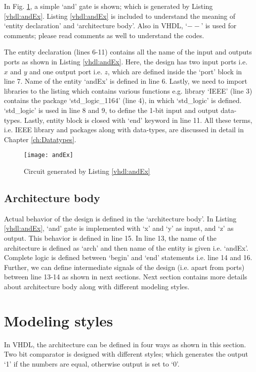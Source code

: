 In Fig. \ref{fig:andEx}, a simple `and' gate is shown; which is generated by Listing \ref{vhdl:andEx}. Listing \ref{vhdl:andEx} is included to understand the meaning of `entity declaration' and `architecture body'. Also in VHDL, `$--$' is used for comments; please read comments as well to understand the codes.

The entity declaration (lines 6-11) contains all the name of the input and outputs ports as shown in Listing \ref{vhdl:andEx}. Here, the design has two input ports i.e. $x$ and $y$ and one output port i.e. $z$, which are defined inside the `port' block in line 7. Name of the entity `andEx' is defined in line 6. Lastly, we need to import libraries to the listing which contains various functions e.g. library `IEEE' (line 3) contains the package `std\_logic\_1164' (line 4), in which `std\_logic' is defined. `std\_logic' is used in line 8 and 9, to define the 1-bit input and output data-types. Lastly, entity block is closed with `end' keyword in line 11. All these terms, i.e. IEEE library and packages along with data-types, are discussed in detail in Chapter \ref{ch:Datatypes}.  

\begin{figure}
	\centering
	\texttt{[image: andEx]}
	\caption{Circuit generated by Listing \ref{vhdl:andEx}}
	\label{fig:andEx}
\end{figure}



\subsection{Architecture body} 
Actual behavior of the design is defined in  the `architecture body'. In Listing \ref{vhdl:andEx}, `and' gate is implemented with `x' and `y' as input, and `z' as output. This behavior is defined in line 15. In line 13, the name of the architecture is defined as `arch' and then name of the entity is given i.e. `andEx'. Complete logic is defined between `begin' and `end' statements i.e. line 14 and 16. Further, we can define intermediate signals of the design (i.e. apart from ports) between line 13-14 as shown in next sections. Next section contains more details about architecture body along with different modeling styles. 

\section{Modeling styles}
In VHDL, the architecture can be defined in four ways as shown in this section. Two bit comparator is designed with different styles; which generates the output `1' if the numbers are equal, otherwise output is set to `0'.   

